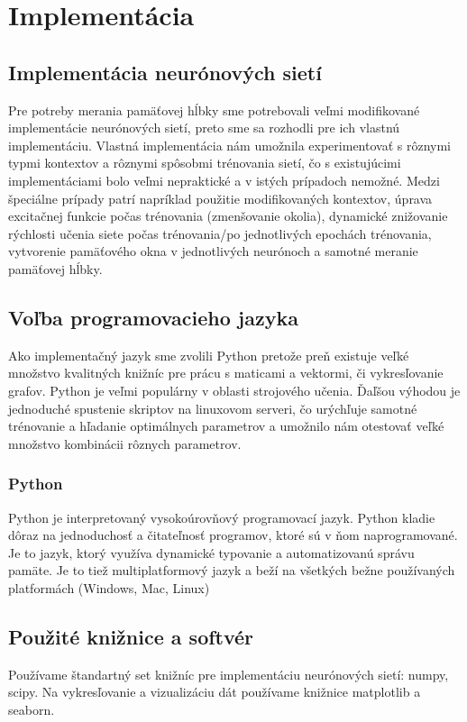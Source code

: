 \chapter{Implementácia}

\section{Implementácia neurónových sietí}
Pre potreby merania pamäťovej hĺbky sme potrebovali 
veľmi modifikované implementácie neurónových sietí, 
preto sme sa rozhodli pre ich vlastnú implementáciu. 
Vlastná implementácia nám umožnila experimentovať s rôznymi typmi kontextov a rôznymi spôsobmi 
trénovania sietí, čo s existujúcimi implementáciami bolo veľmi nepraktické a v istých prípadoch nemožné.
Medzi špeciálne prípady patrí napríklad použitie modifikovaných kontextov, 
úprava excitačnej funkcie počas trénovania (zmenšovanie okolia), dynamické znižovanie rýchlosti
učenia siete počas trénovania/po jednotlivých epochách trénovania, vytvorenie pamäťového okna v jednotlivých neurónoch 
a samotné meranie pamäťovej hĺbky.

\section{Voľba programovacieho jazyka}
Ako implementačný jazyk sme zvolili Python pretože preň existuje veľké množstvo kvalitných knižníc pre prácu
s maticami a vektormi, či vykresľovanie grafov.
Python je veľmi populárny v oblasti strojového učenia. 
Ďaľšou výhodou je jednoduché spustenie skriptov
na linuxovom serveri, čo urýchľuje samotné trénovanie a hľadanie optimálnych parametrov a umožnilo nám otestovať 
veľké množstvo kombinácii rôznych parametrov.
\subsection{Python}

Python je interpretovaný vysokoúrovňový programovací jazyk. 
Python kladie dôraz na jednoduchosť a čitateľnosť programov, ktoré sú v ňom naprogramované.
Je to jazyk, ktorý využíva dynamické typovanie a automatizovanú správu pamäte. Je to tiež multiplatformový 
jazyk a beží na všetkých bežne používaných platformách (Windows, Mac, Linux)

\section{Použité knižnice a softvér}
Používame štandartný set knižníc pre implementáciu neurónových sietí: numpy, scipy.
Na vykresľovanie a vizualizáciu dát používame knižnice matplotlib a seaborn.
